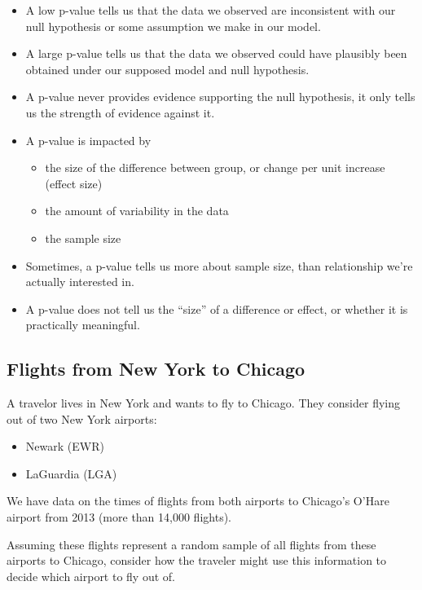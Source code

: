 \documentclass[]{book}
\providecommand{\tightlist}{%
  \setlength{\itemsep}{0pt}\setlength{\parskip}{0pt}}
\begin{document}
\begin{itemize}
\item
  A low p-value tells us that the data we observed are inconsistent with
  our null hypothesis or some assumption we make in our model.
\item
  A large p-value tells us that the data we observed could have
  plausibly been obtained under our supposed model and null hypothesis.
\item
  A p-value never provides evidence supporting the null hypothesis, it
  only tells us the strength of evidence against it.
\item
  A p-value is impacted by

  \begin{itemize}
  \tightlist
  \item
    the size of the difference between group, or change per unit
    increase (effect size)\\
  \item
    the amount of variability in the data\\
  \item
    the sample size
  \end{itemize}
\item
  Sometimes, a p-value tells us more about sample size, than
  relationship we're actually interested in.
\item
  A p-value does not tell us the ``size'' of a difference or effect, or
  whether it is practically meaningful.
\end{itemize}

\subsection{Flights from New York to
Chicago}\label{flights-from-new-york-to-chicago}

A travelor lives in New York and wants to fly to Chicago. They consider
flying out of two New York airports:

\begin{itemize}
\tightlist
\item
  Newark (EWR)\\
\item
  LaGuardia (LGA)
\end{itemize}

We have data on the times of flights from both airports to Chicago's
O'Hare airport from 2013 (more than 14,000 flights).

Assuming these flights represent a random sample of all flights from
these airports to Chicago, consider how the traveler might use this
information to decide which airport to fly out of.
\end{document}
